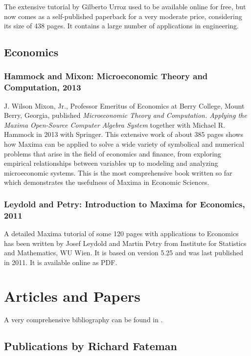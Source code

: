 \documentclass[../Maxima_Workbook.tex]{subfiles}
\begin{document}
The extensive tutorial by Gilberto Urroz used to be available online for free, but now comes as a self-published paperback for a very moderate price, considering its size of 438 pages. It contains a large number of applications in engineering.

\subsection{Economics}

\subsubsection{Hammock and Mixon: Microeconomic Theory and Computation, 2013}

J. Wilson Mixon, Jr., Professor Emeritus of Economics at Berry College, Mount Berry, Georgia, published \emph{Microeconomic Theory and Computation. Applying the Maxima Open-Source Computer Algebra System} together with Michael R. Hammock in 2013 with Springer. This extensive work of about 385 pages shows how Maxima can be applied to solve a wide variety of symbolical and numerical problems that arise in the field of economics and finance, from exploring empirical relationships between variables up to modeling and analyzing microeconomic systems. This is the most comprehensive book written so far which demonstrates the usefulness of Maxima in Economic Sciences. 

\subsubsection{Leydold and Petry: Introduction to Maxima for Economics, 2011}

A detailed Maxima tutorial of some 120 pages with applications to Economics has been written by Josef Leydold and Martin Petry from Institute for Statistics and Mathematics, WU Wien. It is based on version 5.25 and was last published in 2011. It is available online as PDF.

\section{Articles and Papers}

A very comprehensive bibliography can be found in \cite{SouzaMaxB}.

\subsection{Publications by Richard Fateman}
\end{document}
